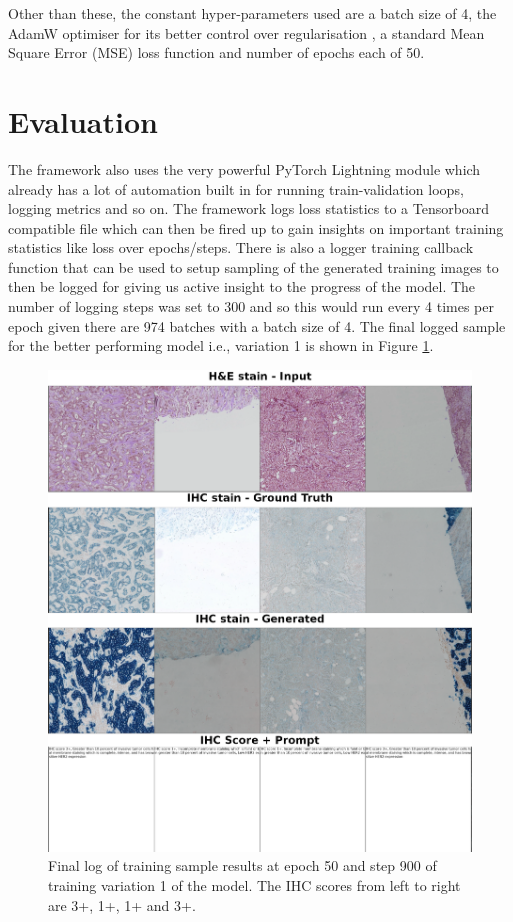 Other than these, the constant hyper-parameters used are a batch size of 4, the AdamW optimiser for its better control over regularisation \parencite{Loshchilov2017DecoupledRegularization}, a standard Mean Square Error (MSE) loss function and number of epochs each of 50. 

\section{Evaluation}

The framework also uses the very powerful PyTorch Lightning module which already has a lot of automation built in for running train-validation loops, logging metrics and so on. The framework logs loss statistics to a Tensorboard compatible file which can then be fired up to gain insights on important training statistics like loss over epochs/steps. There is also a logger training callback function that can be used to setup sampling of the generated training images to then be logged for giving us active insight to the progress of the model. The number of logging steps was set to 300 and so this would run every 4 times per epoch given there are 974 batches with a batch size of 4. The final logged sample for the better performing model i.e., variation 1 is shown in Figure \ref{fig:best-train-log}.

\begin{figure}[ht]
    \centering
    \includegraphics[width=0.75\linewidth]{4_ResearchMethodology/figures/v4-training-e49-b900-Result.png}
    \caption[Final log of training sample results]{Final log of training sample results at epoch 50 and step 900 of training variation 1 of the model. The IHC scores from left to right are 3+, 1+, 1+ and 3+.}
    \label{fig:best-train-log}
\end{figure}

